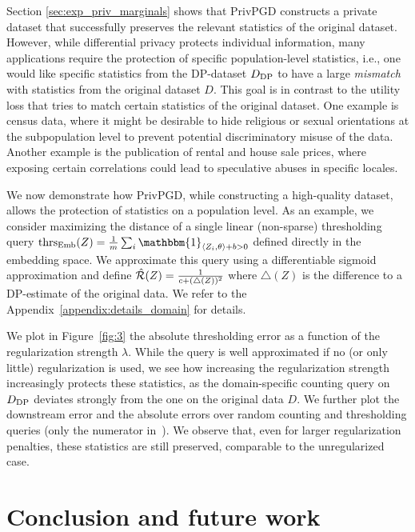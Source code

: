 Section \ref{sec:exp_priv_marginals} shows that PrivPGD constructs a private dataset that successfully preserves the relevant statistics of the original dataset. 
However, while differential privacy protects individual information, many applications require the protection of specific population-level statistics, i.e., one would like specific statistics from the DP-dataset $D_{\text{DP}}$ to have a large \emph{mismatch} with statistics from the original dataset $D$. 
This goal is in contrast to the utility loss that tries to match certain statistics of the original dataset.
One example is census data, where it might be desirable to hide religious or sexual orientations at the subpopulation level to prevent potential discriminatory misuse of the data. Another example is the publication of rental and house sale prices, where exposing certain correlations could lead to speculative abuses in specific locales.

We now demonstrate how PrivPGD, while constructing a high-quality dataset,
 allows the protection of statistics on a population level. As an example, we consider maximizing the distance of a single linear (non-sparse) thresholding query $    \text{thrs}_{\embed}(\particles) = \frac{1}{m} \sum_i 
\mathbbm{1}_{\langle \particles_i, \theta \rangle + b >0}$ defined directly in the embedding space. We approximate this query using a differentiable sigmoid approximation and define $\hat {\mathcal R}(Z) = \frac{1}{c + (\triangle(Z))^2}$ where $\triangle(Z)$ is the difference to a DP-estimate of the original data. We refer to the Appendix~\ref{appendix:details_domain} for details.


 We plot in Figure~\ref{fig:3} the absolute thresholding error as a function of the regularization strength $\lambda$. While the query is well approximated if no (or only little) regularization is used, we see how increasing the regularization strength increasingly protects these statistics, as the domain-specific counting query on $D_{\text{DP}}$ deviates strongly from the one on the original data $D$. 
We further plot the downstream error and the absolute errors over random counting and thresholding queries (only the numerator in~). We observe that, even for larger regularization penalties, these statistics are still preserved, comparable to the unregularized case. 



\section{Conclusion and future work}


